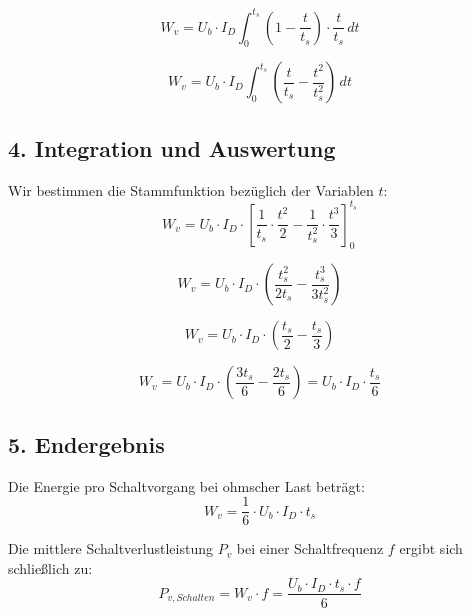 \documentclass{article}
\begin{document}
\begin{equation}
W_v = U_b \cdot I_D \int_{0}^{t_s} \left( 1 - \frac{t}{t_s} \right) \cdot \frac{t}{t_s} \, dt
\end{equation}

\begin{equation}
W_v = U_b \cdot I_D \int_{0}^{t_s} \left( \frac{t}{t_s} - \frac{t^2}{t_s^2} \right) \, dt
\end{equation}

\subsection*{4. Integration und Auswertung}
Wir bestimmen die Stammfunktion bezüglich der Variablen $t$:
\begin{equation}
W_v = U_b \cdot I_D \cdot \left[ \frac{1}{t_s} \cdot \frac{t^2}{2} - \frac{1}{t_s^2} \cdot \frac{t^3}{3} \right]_{0}^{t_s}
\end{equation}

\begin{equation}
W_v = U_b \cdot I_D \cdot \left( \frac{t_s^2}{2 t_s} - \frac{t_s^3}{3 t_s^2} \right)
\end{equation}

\begin{equation}
W_v = U_b \cdot I_D \cdot \left( \frac{t_s}{2} - \frac{t_s}{3} \right)
\end{equation}

\begin{equation}
W_v = U_b \cdot I_D \cdot \left( \frac{3 t_s}{6} - \frac{2 t_s}{6} \right) = U_b \cdot I_D \cdot \frac{t_s}{6}
\end{equation}

\subsection*{5. Endergebnis}
Die Energie pro Schaltvorgang bei ohmscher Last beträgt:
\begin{equation}
W_v = \frac{1}{6} \cdot U_b \cdot I_D \cdot t_s
\end{equation}

Die mittlere Schaltverlustleistung $P_v$ bei einer Schaltfrequenz $f$ ergibt sich schließlich zu:
\begin{equation}
P_{v, Schalten} = W_v \cdot f = \frac{U_b \cdot I_D \cdot t_s \cdot f}{6}
\end{equation}
\end{document}
